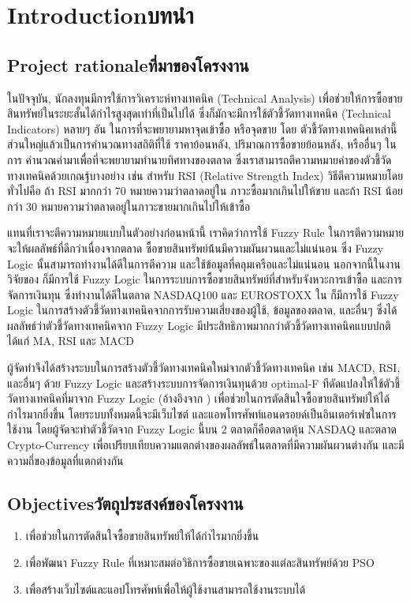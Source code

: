 \chapter{\ifenglish Introduction\else บทนำ\fi}

\section{\ifenglish Project rationale\else ที่มาของโครงงาน\fi}
ในปัจจุบัน, นักลงทุนมีการใช้การวิเคราะห์ทางเทคนิค (Technical Analysis) เพื่อช่วยให้การซื้อขายสินทรัพย์ในระยะสั้นได้กำไรสูงสุดเท่าที่เป็นไปได้
ซึ่งก็มักจะมีการใช้ตัวชี้วัดทางเทคนิค (Technical Indicators) หลายๆ อัน ในการที่จะพยายามหาจุดเข้าซื้อ หรือจุดขาย โดย 
ตัวชี้วัดทางเทคนิคเหล่านี้ส่วนใหญ่แล้วเป็นการคำนวณทางสถิติที่ใช้ ราคาย้อนหลัง, ปริมาณการซื้อขายย้อนหลัง, หรืออื่นๆ ในการ
คำนวณค่ามาเพื่อที่จะพยายามทำนายทิศทางของตลาด ซึ่งเราสามารถตีความหมายค่าของตัวชี้วัดทางเทคนิคด้วยเกณฐ์บางอย่าง เช่น 
สำหรับ RSI (Relative Strength Index) วิธีตีความหมายโดยทั่วไปคือ ถ้า RSI มากกว่า 70 หมายความว่าตลาดอยู่ใน
ภาวะซื้อมากเกินไปให้ขาย และถ้า RSI น้อยกว่า 30 หมายความว่าตลาดอยู่ในภาวะขายมากเกินไปให้เข้าซื้อ

แทนที่เราจะตีความหมายแบบในตัวอย่างก่อนหน้านี้ เราคิดว่าการใช้ Fuzzy Rule ในการตีความหมายจะให้ผลลัพธ์ที่ดีกว่าเนื่องจากตลาด
ซื้อขายสินทรัพย์น้้นมีความผันผวนและไม่แน่นอน ซึ่ง Fuzzy Logic นั้นสามารถทำงานได้ดีในการตีความ และใช้ข้อมูลที่คลุมเครือและไม่แน่นอน
นอกจากนี้ในงานวิจัยของ \cite{Rodrigo} ก็มีการใช้ Fuzzy Logic ในการระบบการซื้อขายสินทรัพย์ที่สำหรับจังหวะการเข้าซื้อ
และการจัดการเงินทุน ซึ่งทำงานได้ดีในตลาด NASDAQ100 และ EUROSTOXX ใน \cite{Escobar} ก็มีการใช้ Fuzzy Logic
ในการสร้างตัวชี้วัดทางเทคนิคจากการรับความเสี่ยงของผู้ใช้, ข้อมูลของตลาด, และอื่นๆ ซึ่งได้ผลลัพธ์ว่าตัวชี้วัดทางเทคนิคจาก Fuzzy Logic
มีประสิทธิภาพมากกว่าตัวชี้วัดทางเทคนิคแบบปกติ ได้แก่ MA, RSI และ MACD

ผู้จัดทำจึงได้สร้างระบบในการสร้างตัวชี้วัดทางเทคนิคใหม่จากตัวชี้วัดทางเทคนิค เช่น MACD, RSI, และอื่นๆ ด้วย Fuzzy Logic และสร้างระบบการจัดการเงินทุนด้วย
optimal-F ทีดัดแปลงให้ใช้ตัวชี้วัดทางเทคนิคที่มาจาก Fuzzy Logic (อ้างอิงจาก \cite{Rodrigo}) เพื่อช่วยในการตัดสินใจซื้อขายสินทรัพย์ให้ได้กำไรมากยิ่งขึ้น
โดยระบบทั้งหมดนี้จะมีเว็บไซต์ และแอพโทรศัพท์แอนดรอยด์เป็นอินเตอร์เฟซในการใช้งาน โดยผู้จัดจะทำตัวชี้วัดจาก Fuzzy Logic นี้บน 2 ตลาดก็คือตลาดหุ้น NASDAQ และตลาด Crypto-Currency
เพื่อเปรียบเทียบความแตกต่างของผลลัพธ์ในตลาดที่มีความผันผวนต่างกัน และมีความถึ่ของข้อมูลที่แตกต่างกัน

\section{\ifenglish Objectives\else วัตถุประสงค์ของโครงงาน\fi}
\begin{enumerate}
    \item เพื่อช่วยในการตัดสินใจซื้อขายสินทรัพย์ให้ได้กำไรมากยิ่งขึ้น
    \item เพื่อพัฒนา Fuzzy Rule ที่เหมาะสมต่อวิธิการซื้อขายเฉพาะของแต่ละสินทรัพย์ด้วย PSO
    \item เพื่อสร้างเว็บไซต์และแอปโทรศัพท์เพื่อให้ผู้ใช้งานสามารถใช้งานระบบได้
\end{enumerate}

